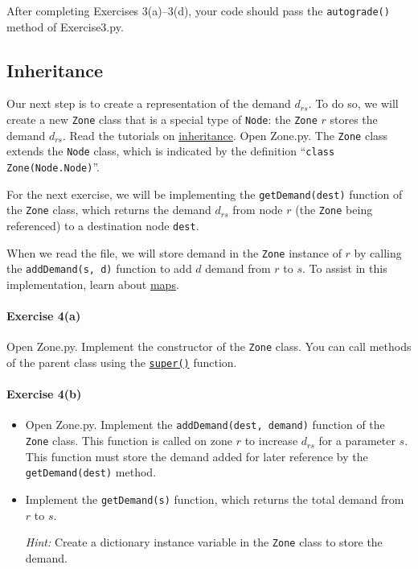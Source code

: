 \documentclass[11pt]{article}
\begin{document}
 \vspace{\baselineskip}

\noindent
After completing Exercises 3(a)--3(d), your code should pass the \texttt{autograde()} method of Exercise3.py. 




\subsection{Inheritance}
\label{sec32}

Our next step is to create a representation of the demand $d_{rs}$. To do so, we will create a new \texttt{Zone} class that is a special type of \texttt{Node}: the \texttt{Zone} $r$ stores the demand $d_{rs}$. Read the tutorials on \href{https://www.w3schools.com/python/python_inheritance.asp}{inheritance}. Open Zone.py. 
The \texttt{Zone} class extends the \texttt{Node} class, which is indicated by the definition ``\texttt{class Zone(Node.Node)}''.
 
For the next exercise, we will be implementing the \texttt{getDemand(dest)} function of the \texttt{Zone} class, which returns the demand $d_{rs}$ from node $r$ (the \texttt{Zone} being referenced) to a destination node \texttt{dest}. 

When we read the file, we will store demand in the \texttt{Zone} instance of $r$ by calling the \texttt{addDemand(s, d)} function to add $d$ demand from $r$ to $s$.
To assist in this implementation, learn about \href{https://www.w3schools.com/python/python_dictionaries.asp}{maps}. 
	
	
\paragraph*{Exercise 4(a)} Open Zone.py. Implement the constructor of the \texttt{Zone} class.
You can call methods of the parent class using the \href{https://www.w3schools.com/python/ref_func_super.asp}{\texttt{super()}} function.

\paragraph*{Exercise 4(b)} 
\begin{itemize}
\item Open Zone.py. Implement the \texttt{addDemand(dest, demand)} function of the \texttt{Zone} class. This function is called on zone $r$ to increase $d_{rs}$ for a parameter $s$. This function must store the demand added for later reference by the \texttt{getDemand(dest)} method. 
\item 
Implement the \texttt{getDemand(s)} function, which returns the total demand from $r$ to $s$.

\textit{Hint: } Create a dictionary instance variable in the \texttt{Zone} class to store the demand.
\end{itemize}
\end{document}
